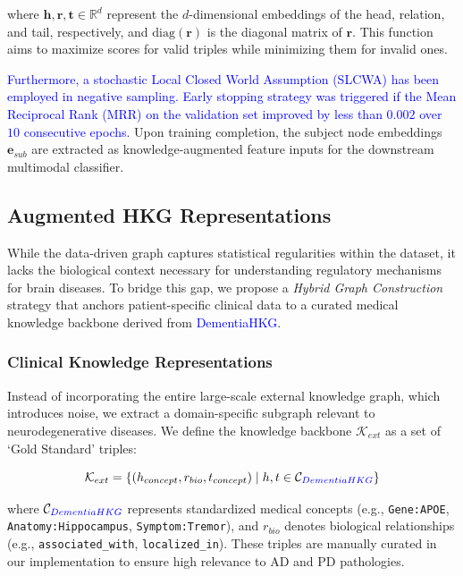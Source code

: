 \documentclass[lettersize,journal]{IEEEtran}
\begin{document}
    where $\mathbf{h}, \mathbf{r}, \mathbf{t} \in \mathbb{R}^d$ represent the $d$-dimensional embeddings of the head, relation, and tail, respectively, and $\text{diag}(\mathbf{r})$ is the diagonal matrix of $\mathbf{r}$. This function aims to maximize scores for valid triples while minimizing them for invalid ones.

    \textcolor{blue}{Furthermore, a stochastic Local Closed World Assumption (SLCWA) has been employed in negative sampling. Early stopping strategy was triggered if the Mean Reciprocal Rank (MRR) on the validation set improved by less than $0.002$ over $10$ consecutive epochs.}
    Upon training completion, the subject node embeddings $\mathbf{e}_{sub}$ are extracted as knowledge-augmented feature inputs for the downstream multimodal classifier.


\subsection{Augmented HKG Representations}

    While the data-driven graph captures statistical regularities within the dataset, it lacks the biological context necessary for understanding regulatory mechanisms for brain diseases. To bridge this gap, we propose a \textit{Hybrid Graph Construction} strategy that anchors patient-specific clinical data to a curated medical knowledge backbone derived from \textcolor{blue}{DementiaHKG}.

\subsubsection{Clinical Knowledge Representations}

    Instead of incorporating the entire large-scale external knowledge graph, which introduces noise, we extract a domain-specific subgraph relevant to neurodegenerative diseases. We define the knowledge backbone $\mathcal{K}_{ext}$ as a set of `Gold Standard' triples:

    \begin{equation}
        \mathcal{K}_{ext} = \{ (h_{concept}, r_{bio}, t_{concept}) \mid h, t \in \mathcal{C}_{\textcolor{blue}{DementiaHKG}} \}
        \label{Eq5}
    \end{equation}

    where $\mathcal{C}_{\textcolor{blue}{DementiaHKG}}$ represents standardized medical concepts (e.g., \texttt{Gene:APOE}, \texttt{Anatomy:Hippocampus}, \texttt{Symptom:Tremor}), and $r_{bio}$ denotes biological relationships (e.g., \texttt{associated\_with}, \texttt{localized\_in}). These triples are manually curated in our implementation to ensure high relevance to AD and PD pathologies.
\end{document}

